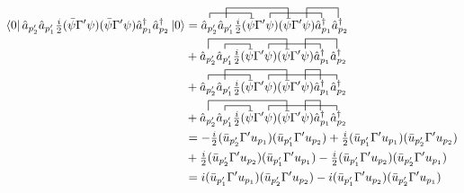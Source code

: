 \documentclass[12pt]{article}
\newcommand{\bra}[1]{\left| #1 \right>}
\newcommand{\ket}[1]{\left| #1 \right>}
\renewcommand{\bra}[1]{\left< #1 \right|}
\renewcommand{\a}{\hat{a}}
\newcommand{\adag}{\hat{a}^\dagger}
\begin{document}
\begin{align*}
\bra{0} \a_{p_2'} \a_{p_1'} \tfrac{i}{2} ( \bar{\psi} \Gamma' \psi) (\bar{\psi} \Gamma' \psi)\adag_{p_1} \adag_{p_2} \ket{0} 
& =
\contraction{}{ \a_{p_2'}}{ \a_{p_1'}\tfrac{i}{2} ( }{\bar{\psi}}
\contraction[2ex]{\a_{p_2'} }{ \a_{p_1'} }{ \tfrac{i}{2} ( \bar{\psi} \Gamma' \psi) (} {\bar{\psi}} 
\contraction{\a_{p_2'} \a_{p_1'} \tfrac{i}{2} ( \bar{\psi} \Gamma'}{ \psi}{) (\bar{\psi} \Gamma' \psi)}{\adag}
\contraction[2ex]{\a_{p_2'} \a_{p_1'} \tfrac{i}{2} ( \bar{\psi} \Gamma' \psi) (\bar{\psi} \Gamma'}{ \psi }{)\adag_{p_1}}{ \adag}
\a_{p_2'} \a_{p_1'} \tfrac{i}{2} ( \bar{\psi} \Gamma' \psi) (\bar{\psi} \Gamma' \psi)\adag_{p_1} \adag_{p_2}
\\
& +  
\contraction{\a_{p_2'}}{ \a_{p_1'}}{\tfrac{i}{2} ( }{\bar{\psi}}
\contraction[2ex]{}{ \a_{p_2'} }{ \a_{p_1'} \tfrac{i}{2} ( \bar{\psi} \Gamma' \psi) (} {\bar{\psi}} 
\contraction{\a_{p_2'} \a_{p_1'} \tfrac{i}{2} ( \bar{\psi} \Gamma'}{ \psi}{) (\bar{\psi} \Gamma' \psi)}{\adag}
\contraction[2ex]{\a_{p_2'} \a_{p_1'} \tfrac{i}{2} ( \bar{\psi} \Gamma' \psi) (\bar{\psi} \Gamma'}{ \psi }{)\adag_{p_1}}{ \adag}
\a_{p_2'} \a_{p_1'} \tfrac{i}{2} ( \bar{\psi} \Gamma' \psi) (\bar{\psi} \Gamma' \psi)\adag_{p_1} \adag_{p_2} 
\\
& + 
\contraction{}{ \a_{p_2'}}{ \a_{p_1'}\tfrac{i}{2} ( }{\bar{\psi}}
\contraction[2ex]{\a_{p_2'} }{ \a_{p_1'} }{ \tfrac{i}{2} ( \bar{\psi} \Gamma' \psi) (} {\bar{\psi}} 
\contraction{\a_{p_2'} \a_{p_1'} \tfrac{i}{2} ( \bar{\psi} \Gamma'}{ \psi}{) (\bar{\psi} \Gamma' \psi) \adag_{p_1}}{\adag}
\contraction[2ex]{\a_{p_2'} \a_{p_1'} \tfrac{i}{2} ( \bar{\psi} \Gamma' \psi) (\bar{\psi} \Gamma'}{ \psi }{)}{\adag}
\a_{p_2'} \a_{p_1'} \tfrac{i}{2} ( \bar{\psi} \Gamma' \psi) (\bar{\psi} \Gamma' \psi)\adag_{p_1} \adag_{p_2} 
\\
& +  
\contraction{\a_{p_2'}}{ \a_{p_1'}}{\tfrac{i}{2} ( }{\bar{\psi}}
\contraction[2ex]{}{ \a_{p_2'} }{ \a_{p_1'} \tfrac{i}{2} ( \bar{\psi} \Gamma' \psi) (} {\bar{\psi}} 
\contraction{\a_{p_2'} \a_{p_1'} \tfrac{i}{2} ( \bar{\psi} \Gamma'}{ \psi}{) (\bar{\psi} \Gamma' \psi) \adag_{p_1}}{\adag}
\contraction[2ex]{\a_{p_2'} \a_{p_1'} \tfrac{i}{2} ( \bar{\psi} \Gamma' \psi) (\bar{\psi} \Gamma'}{ \psi }{)}{\adag}
\a_{p_2'} \a_{p_1'} \tfrac{i}{2} ( \bar{\psi} \Gamma' \psi) (\bar{\psi} \Gamma' \psi)\adag_{p_1} \adag_{p_2} 
\\
& = -\tfrac{i}{2} ( \bar{u}_{p_2'} \Gamma' u_{p_1}) (\bar{u}_{p_1'} \Gamma' u_{p_2}) + \tfrac{i}{2} ( \bar{u}_{p_1'} \Gamma' u_{p_1}) (\bar{u}_{p_2'} \Gamma' u_{p_2})
\\
& + \tfrac{i}{2} ( \bar{u}_{p_2'} \Gamma' u_{p_2}) (\bar{u}_{p_1'} \Gamma' u_{p_1}) - \tfrac{i}{2} ( \bar{u}_{p_1'} \Gamma' u_{p_2}) (\bar{u}_{p_2'} \Gamma' u_{p_1})
\\
& = i ( \bar{u}_{p_1'} \Gamma' u_{p_1}) (\bar{u}_{p_2'} \Gamma' u_{p_2}) - i ( \bar{u}_{p_1'} \Gamma' u_{p_2}) (\bar{u}_{p_2'} \Gamma' u_{p_1})
\end{align*}
\end{document}
